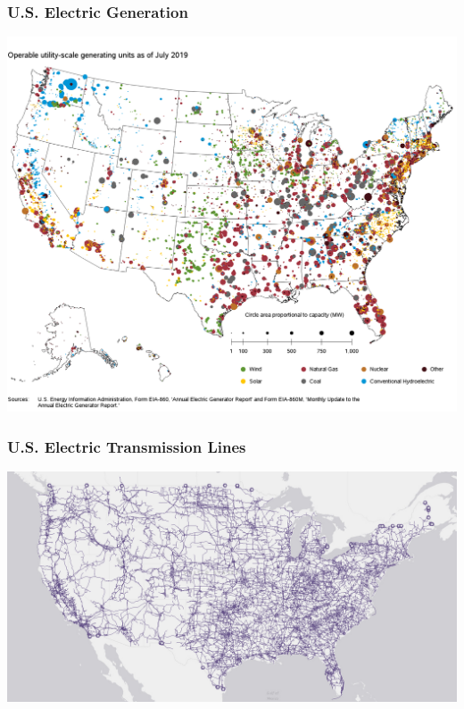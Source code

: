 \documentclass[14pt, unknownkeysallowed]{beamer}
\begin{document}
\begin{frame}
\frametitle{U.S. Electric Generation}
\begin{center}
\includegraphics[height=.82\textheight]{july2019map} {\tiny \cite{USgenerationMAP} } %
\end{center}
\end{frame}
\begin{frame}
\frametitle{U.S. Electric Transmission Lines}
{\centering%
\includegraphics[width=\linewidth]{UStransmission} {\tiny \cite{UStransmissionMAP} } %
}
\end{frame}
\end{document}
